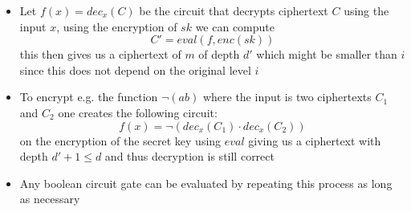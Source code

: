 \begin{itemize}
\begin{itemize}
\begin{itemize}
            \item Let $f(x) = dec_x(C)$ be the circuit that decrypts ciphertext $C$ using the input $x$, using the encryption of $sk$ we can compute
            \begin{equation*}
                C' = eval(f, enc(sk))
            \end{equation*}
            this then gives us a ciphertext of $m$ of depth $d'$ which might be smaller than $i$ since this does not depend on the original level $i$
            \item To encrypt e.g. the function $\neg(ab)$ where the input is two ciphertexts $C_1$ and $C_2$ one creates the following circuit:
            \begin{equation*}
                f(x) = \neg(dec_x(C_1) \cdot dec_x(C_2))
            \end{equation*}
            on the encryption of the secret key using $eval$ giving us a ciphertext with depth $d' + 1 \leq d$ and thus decryption is still correct
            \item Any boolean circuit gate can be evaluated by repeating this process as long as necessary

        \end{itemize}
    \end{itemize}
\end{itemize}


